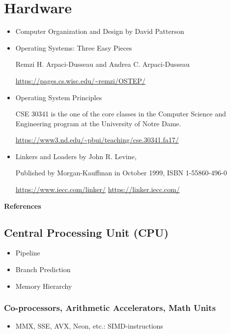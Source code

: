 \documentclass[12pt,a4paper]{article}
\begin{document}
\section{Hardware}

\begin{itemize}
\item Computer Organization and Design by David Patterson
\item Operating Systems: Three Easy Pieces

    Remzi H. Arpaci-Dusseau and Andrea C. Arpaci-Dusseau

    \url{https://pages.cs.wisc.edu/~remzi/OSTEP/}

\item Operating System Principles

    CSE 30341 is the one of the core classes in the Computer Science and 
    Engineering program at the University of Notre Dame.

    \url{https://www3.nd.edu/~pbui/teaching/cse.30341.fa17/}

\item Linkers and Loaders by John R. Levine,

    Published by Morgan-Kauffman in October 1999, ISBN 1-55860-496-0

    \url{https://www.iecc.com/linker/}
    \url{https://linker.iecc.com/}

\end{itemize}

\textbf{References}

\subsection{Central Processing Unit (CPU)}

\begin{itemize}
\item Pipeline
\item Branch Prediction
\item Memory Hierarchy
\end{itemize}

\subsubsection{Co-processors, Arithmetic Accelerators, Math Units}

\begin{itemize}
\item MMX, SSE, AVX, Neon, etc.: SIMD-instructions
\end{itemize}
\end{document}
